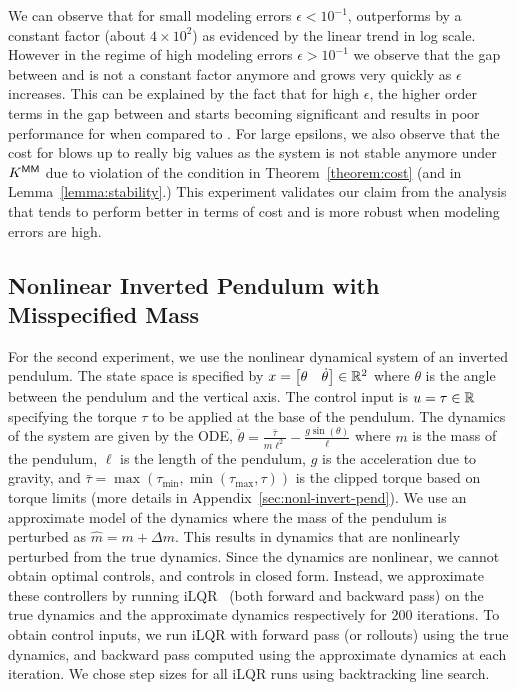 We can observe that for small modeling errors $\epsilon < 10^{-1}$, \ILC{}
outperforms \MM{} by a constant factor (about $4\times 10^{2}$) as evidenced by the linear
trend in log scale. However in the regime of high modeling errors
$\epsilon > 10^{-1}$ we observe that the gap between \ILC{} and \MM{} is not a
constant factor anymore and grows very quickly as $\epsilon$ increases. This can
be explained by the fact that for high $\epsilon$, the
higher order terms in the gap between \ILC{} and \MM{} starts becoming significant
and results in poor performance for \MM{} when compared to \ILC{}. For large epsilons,
we also observe that the cost for \MM{} blows up to really big values as the system
is not stable anymore under $K^\mathsf{MM}$ due to violation of the condition
in Theorem~\ref{theorem:cost} (and in
Lemma~\ref{lemma:stability}.) This experiment validates our claim from the
analysis that \ILC{} tends to perform better in terms of cost and is more robust
when modeling errors are high.

\subsection{Nonlinear Inverted Pendulum with Misspecified Mass}
\label{sec:invert-pend-with}

For the second experiment, we use the nonlinear dynamical system of an inverted
pendulum. The state space is specified by $x =
\begin{bmatrix}
  \theta &
  \dot{\theta}
\end{bmatrix} \in \mathbb{R}^{2}
$ where $\theta$ is the angle between the pendulum and the vertical axis. The
control input is $u = \tau \in \mathbb{R}$ specifying the torque $\tau$ to be
applied at the base of the pendulum. The dynamics of the system are
given by the ODE,
$\ddot{\theta} = \frac{\bar{\tau}}{m\ell^{2}} - \frac{g\sin(\theta)}{\ell}$
where $m$ is the mass of the pendulum, $\ell$ is the length of the pendulum, $g$
is the acceleration due to gravity, and
$\bar{\tau} = \max(\tau_{\min}, \min(\tau_{\max}, \tau))$ is the clipped torque
based on torque limits (more details in
Appendix~\ref{sec:nonl-invert-pend}). 
We use an approximate model of the dynamics where the mass of the pendulum is
perturbed as $\hat{m} = m + \Delta m$.
This results in dynamics that are nonlinearly perturbed from the true dynamics.
Since the dynamics are nonlinear, we cannot obtain
optimal controls, and \MM{} controls in closed form. Instead, we approximate these
controllers by running iLQR~\cite{li04} (both forward and backward pass) on the
true dynamics and the approximate
dynamics respectively for $200$ iterations. To obtain \ILC{} control inputs, we run
iLQR with forward pass (or rollouts)
using the true dynamics, and backward pass computed using the approximate
dynamics at each iteration.
We chose step sizes for all iLQR runs using
backtracking line search.

